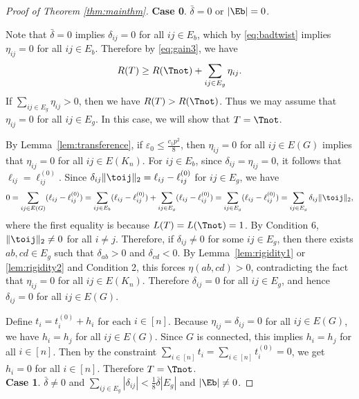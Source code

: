 \begin{proof}[Proof of Theorem \ref{thm:mainthm}]
\noindent \textbf{Case 0}. $\bar{\delta} = 0$ or $|\Eb| = 0$.
\medskip

Note that $\bar{\delta}=0$ implies $\delta_{ij} =0$ for all $ij \in E_b$, which by \eqref{eq:badtwist} implies
$\eta_{ij} =0$ for all $ij \in E_b$.  Therefore by \eqref{eq:gain3}, we have
\[
	R(T) \geq R(\Tnot) + \sum_{ij \in E_g} \eta_{ij}.
\]
If $\sum_{ij \in E_g} \eta_{ij} > 0$, then we have $R(T) > R(\Tnot)$. Thus 
we may assume that $\eta_{ij} = 0$ for all $ij \in E_g$. In this case, we will show that $T = \Tnot$.

By Lemma~\ref{lem:transference}, if $\varepsilon_0 \le \frac{c_1p^2}{8}$, then
$\eta_{ij}=0$ for all $ij \in E(G)$ implies that
$\eta_{ij} = 0$ for all $ij \in E(K_n)$. 
For $ij \in E_b$, since $\delta_{ij} = \eta_{ij} = 0$, it follows that $\ell_{ij} = \ell_{ij}^{(0)}$.
Since $\delta_{ij} \|\toij\|_2 = \ell_{ij} - \ell_{ij}^{(0)}$ for $ij \in E_g$, we have
\[
	0
	= \sum_{ij \in E(G)} (\ell_{ij} - \ell_{ij}^{(0)})
	= \sum_{ij \in E_b} (\ell_{ij} - \ell_{ij}^{(0)}) + \sum_{ij \in E_g} (\ell_{ij} - \ell_{ij}^{(0)})
	= \sum_{ij \in E_g} (\ell_{ij} - \ell_{ij}^{(0)})
	= \sum_{ij \in E_g} \delta_{ij} \|\toij\|_2,
\] 
where the first equality is because $L(T) = L(\Tnot) = 1$.
By Condition 6, $\|\toij\|_2 \neq 0$ for all $i \neq j$. Therefore, if $\delta_{ij} \neq 0$ for some $ij \in E_g$, then there exists $ab, cd \in E_g$ 
such that $\delta_{ab} > 0$ and $\delta_{cd} < 0$. 
By Lemma~\ref{lem:rigidity1} or \ref{lem:rigidity2} and Condition 2, this forces $\eta(ab,cd) > 0$, contradicting the fact that
$\eta_{ij} = 0$ for all $ij \in E(K_n)$. 
Therefore $\delta_{ij} = 0$ for all $ij \in E_g$, and hence
$\delta_{ij} = 0$ for all $ij \in E(G)$.  

Define $t_i = t_i^{(0)} + h_i$ for each $i \in [n]$. Because $\eta_{ij} = \delta_{ij} = 0$ for all $ij \in E(G)$, we have $h_i = h_j$ 
for all $ij \in E(G)$. Since $G$ is connected, this implies $h_i = h_j$ for all 
$i \in [n]$. Then by the constraint $\sum_{i \in [n]} t_i = \sum_{i \in [n]} t_i^{(0)} = 0$, 
we get $h_i = 0$ for all $i \in [n]$. Therefore $T = \Tnot$. \\

\noindent\textbf{Case 1}. $\bar{\delta} \neq 0$ and $\sum_{ij\in E_{g}}|\delta_{ij}|<\frac{1}{8}\overline{\delta}|E_{g}|$ and $|\Eb| \neq 0$. 
\medskip


\end{proof}
